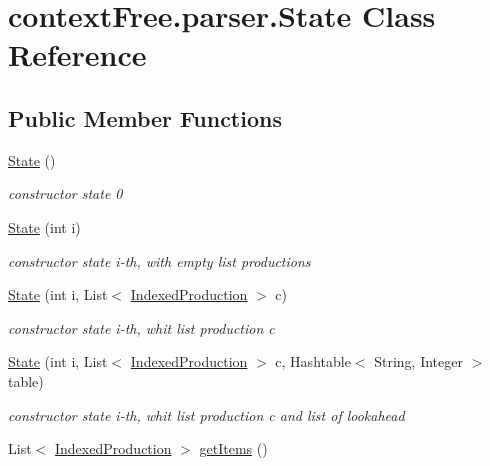 \hypertarget{classcontext_free_1_1parser_1_1_state}{\section{context\-Free.\-parser.\-State Class Reference}
\label{classcontext_free_1_1parser_1_1_state}
}
\subsection*{Public Member Functions}
\begin{DoxyCompactItemize}
\item 
\hyperlink{classcontext_free_1_1parser_1_1_state_a755084c050a72d0186cd27a8f78df9a6}{State} ()
\begin{DoxyCompactList}\small\item\em constructor state 0 \end{DoxyCompactList}\item 
\hyperlink{classcontext_free_1_1parser_1_1_state_aa31409b43285d446a6dc1e8423ed8f65}{State} (int i)
\begin{DoxyCompactList}\small\item\em constructor state i-\/th, with empty list productions \end{DoxyCompactList}\item 
\hyperlink{classcontext_free_1_1parser_1_1_state_a7267946f249aada006c55e3c47a3772b}{State} (int i, List$<$ \hyperlink{classcontext_free_1_1parser_1_1_indexed_production}{Indexed\-Production} $>$ c)
\begin{DoxyCompactList}\small\item\em constructor state i-\/th, whit list production c \end{DoxyCompactList}\item 
\hyperlink{classcontext_free_1_1parser_1_1_state_ab2b42f6581c76d56a2a6b31b8f9b5961}{State} (int i, List$<$ \hyperlink{classcontext_free_1_1parser_1_1_indexed_production}{Indexed\-Production} $>$ c, Hashtable$<$ String, Integer $>$ table)
\begin{DoxyCompactList}\small\item\em constructor state i-\/th, whit list production c and list of lookahead \end{DoxyCompactList}\item 
List$<$ \hyperlink{classcontext_free_1_1parser_1_1_indexed_production}{Indexed\-Production} $>$ \hyperlink{classcontext_free_1_1parser_1_1_state_af1362b89e4973fd940a1a6ba440e9c9e}{get\-Items} ()

\end{DoxyCompactItemize}
